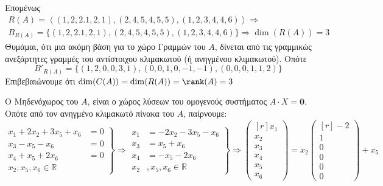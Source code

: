\documentclass[a4paper,table]{report}
\begin{document}
\begin{myitemize}[leftmargin=*]
    Επομένως 
    \begin{gather*}
      R(A) = \left<(1,2,2.1,2,1), (2,4,5,4,5,5), (1,2,3,4,4,6) \right> \Rightarrow \\
      B_{R(A)} = \{ (1,2,2.1,2,1), (2,4,5,4,5,5), (1,2,3,4,4,6) \} \Rightarrow 
      \dim(R(A)) = 3
    \end{gather*} 
    Θυμάμαι, ότι μια ακόμη βάση για το χώρο Γραμμών του $A$, δίνεται από τις 
    γραμμικώς ανεξάρτητες γραμμές του αντίστοιχου κλιμακωτού (ή ανηγμένου κλιμακωτού).
    Οπότε 
    \[
      B'_{R(A)} = \{ (1,2,0,0,3,1), (0,0,1,0,-1,-1), (0,0,0,1,1,2) \}  
    \] 
    Επιβεβαιώνουμε ότι $ \dim(C(A)) = \dim(R(A)) = \rank(A) = 3 $
  \item Ο \textcolor{Col1}{Μηδενόχωρος} του $A$, είναι ο χώρος λύσεων του ομογενούς 
    συστήματος $ A \cdot X = \mathbf{0} $. Οπότε από τον ανηγμένο κλιμακωτό πίνακα του 
    $A$, παίρνουμε:
    \[
      \left.
        \begin{aligned}
          x_{1}+2 x_{2}+ 3 x_{5}+ x_{6}&= 0 \\
          x_{3}- x_{5}- x_{6}&= 0 \\
          x_{4}+ x_{5}+2 x_{6}&= 0 \\
          x_{2}, x_{5}, x_{6} \in \mathbb{R} 
        \end{aligned} 
      \right\}\!\! \Rightarrow 
      \left.
        \begin{aligned}
          x_{1} &= -2 x_{2} - 3 x_{5}- x_{6} \\
          x_{3} &= x_{5}+ x_{6} \\
          x_{4} &= - x_{5}- 2 x_{6} \\
          x_{2} &, x_{5}, x_{6} \in \mathbb{R} 
        \end{aligned} 
      \right\}\!\!\Rightarrow 
      \begin{pmatrix*}[r] 
        x_{1} \\ x_{2} \\ x_{3} \\ x_{4} \\ x_{5} \\ x_{6}  
      \end{pmatrix*} = x_{2} 
      \begin{pmatrix*}[r] -2 \\ 1 \\ 0 \\ 0 \\ 0 \\ 0 \end{pmatrix*} 
      + x_{5} 
\]
\end{myitemize}
\end{document}
